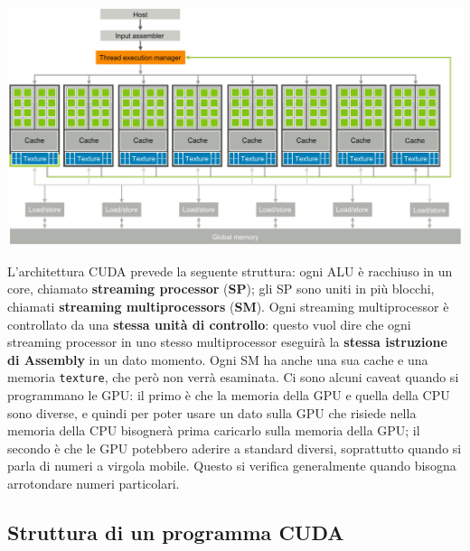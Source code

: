 \begin{center}
    \includegraphics[scale = 0.27]{imgs/001.png}
\end{center}

L'architettura CUDA prevede la seguente struttura: ogni ALU è racchiuso in un core, chiamato \textbf{streaming processor} (\textbf{SP}); gli SP sono uniti in più blocchi, chiamati \textbf{streaming multiprocessors} (\textbf{SM}). Ogni streaming multiprocessor è controllato da una \textbf{stessa unità di controllo}: questo vuol dire che ogni streaming processor in uno stesso multiprocessor eseguirà la \textbf{stessa istruzione di Assembly} in un dato momento. Ogni SM ha anche una sua cache e una memoria \verb|texture|, che però non verrà esaminata.
\nl
Ci sono alcuni caveat quando si programmano le GPU: il primo è che la memoria della GPU e quella della CPU sono diverse, e quindi per poter usare un dato sulla GPU che risiede nella memoria della CPU bisognerà prima caricarlo sulla memoria della GPU; il secondo è che le GPU potebbero aderire a standard diversi, soprattutto quando si parla di numeri a virgola mobile. Questo si verifica generalmente quando bisogna arrotondare numeri particolari.

\subsection{Struttura di un programma CUDA}

